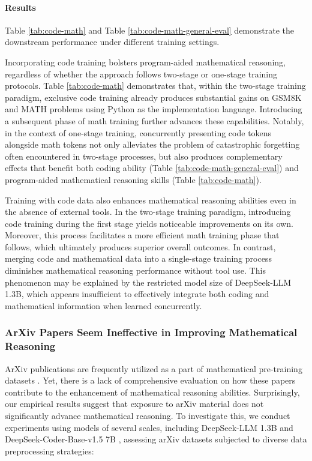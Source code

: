 \begin{itemize}[topsep=0pt]
\paragraph{Results}
Table \ref{tab:code-math} and Table \ref{tab:code-math-general-eval} demonstrate the downstream performance under different training settings.

Incorporating code training bolsters program-aided mathematical reasoning, regardless of whether the approach follows two-stage or one-stage training protocols. Table \ref{tab:code-math} demonstrates that, within the two-stage training paradigm, exclusive code training already produces substantial gains on GSM8K and MATH problems using Python as the implementation language. Introducing a subsequent phase of math training further advances these capabilities. Notably, in the context of one-stage training, concurrently presenting code tokens alongside math tokens not only alleviates the problem of catastrophic forgetting often encountered in two-stage processes, but also produces complementary effects that benefit both coding ability (Table \ref{tab:code-math-general-eval}) and program-aided mathematical reasoning skills (Table \ref{tab:code-math}).

Training with code data also enhances mathematical reasoning abilities even in the absence of external tools. In the two-stage training paradigm, introducing code training during the first stage yields noticeable improvements on its own. Moreover, this process facilitates a more efficient math training phase that follows, which ultimately produces superior overall outcomes. In contrast, merging code and mathematical data into a single-stage training process diminishes mathematical reasoning performance without tool use. This phenomenon may be explained by the restricted model size of DeepSeek-LLM 1.3B, which appears insufficient to effectively integrate both coding and mathematical information when learned concurrently.

\subsubsection{ArXiv Papers Seem Ineffective in Improving Mathematical Reasoning}

ArXiv publications are frequently utilized as a part of mathematical pre-training datasets \citep{minerva,gpt-f,llemma,mathpile}. Yet, there is a lack of comprehensive evaluation on how these papers contribute to the enhancement of mathematical reasoning abilities. Surprisingly, our empirical results suggest that exposure to arXiv material does not significantly advance mathematical reasoning. To investigate this, we conduct experiments using models of several scales, including DeepSeek-LLM 1.3B and DeepSeek-Coder-Base-v1.5 7B \citep{deepseek-coder}, assessing arXiv datasets subjected to diverse data preprocessing strategies:


\end{itemize}
